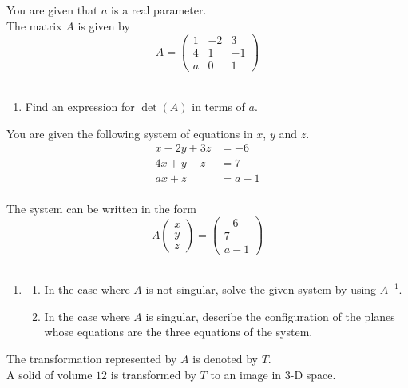 \documentclass[leqno]{article}
\begin{document}
\begin{enumerate}[
  label=\textbf{\arabic*.},
  leftmargin=*,
  topsep=0pt,
  partopsep=0pt,
  parsep=0pt
]
You are given that $a$ is a real parameter. \\

The matrix $A$ is given by
\[
A=\begin{pmatrix}
1 & -2 & 3 \\
4 & 1 & -1 \\
a & 0 & 1
\end{pmatrix}
\] \\

\begin{enumerate}[label=\textbf{(\alph*)}]
  \item Find an expression for $\det(A)$ in terms of $a$.  \\
\end{enumerate}

You are given the following system of equations in $x$, $y$ and $z$. \\

\[
\begin{aligned}
x-2y+3z&=-6 \\
4x+y-z&=7 \\
ax+z&=a-1
\end{aligned}
\] \\

The system can be written in the form
\[
A\begin{pmatrix}x \\ y \\ z\end{pmatrix}=\begin{pmatrix}-6 \\ 7 \\ a-1\end{pmatrix}
\] \\

\begin{enumerate}[label=\textbf{(\alph*)}, resume]
  \item
  \begin{enumerate}[label=(\roman*)]
    \item In the case where $A$ is not singular, solve the given system by using $A^{-1}$. 
    \item In the case where $A$ is singular, describe the configuration of the planes whose equations are the three equations of the system.  \\
  \end{enumerate}
\end{enumerate}

The transformation represented by $A$ is denoted by $T$. \\
A solid of volume $12$ is transformed by $T$ to an image in 3-D space. \\


\end{enumerate}
\end{document}
